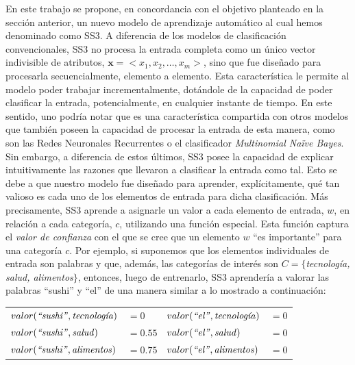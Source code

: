 En este trabajo se propone, en concordancia con el objetivo planteado en la sección anterior, un nuevo modelo de aprendizaje automático al cual hemos denominado como SS3. A diferencia de los modelos de clasificación convencionales, SS3 no procesa la entrada completa como un único vector indivisible de atributos, $\pmb{x}=<x_1,x_2,\dots,x_m>$, sino que fue diseñado para procesarla secuencialmente, elemento a elemento.
Esta característica le permite al modelo poder trabajar incrementalmente, dotándole de la capacidad de poder clasificar la entrada, potencialmente, en cualquier instante de tiempo.
En este sentido, uno podría notar que es una característica compartida con otros modelos que también poseen la capacidad de procesar la entrada de esta manera, como son las Redes Neuronales Recurrentes o el clasificador \emph{Multinomial Naïve Bayes}.
Sin embargo, a diferencia de estos últimos, SS3 posee la capacidad de explicar intuitivamente las razones que llevaron a clasificar la entrada como tal.
Esto se debe a que nuestro modelo fue diseñado para aprender, explícitamente, qué tan valioso es cada uno de los elementos de entrada para dicha clasificación.
Más precisamente, SS3 aprende a asignarle un valor a cada elemento de entrada, $w$, en relación a cada categoría, $c$, utilizando una función especial.
Esta función captura el \emph{valor de confianza} con el que se cree que un elemento $w$ ``es importante'' para una categoría $c$.
Por ejemplo, si suponemos que los elementos individuales de entrada son palabras y que, además, las categorías de interés son $C= \{$\emph{tecnología, salud, alimentos}$\}$, entonces, luego de entrenarlo, SS3 aprendería a valorar las palabras ``sushi'' y ``el'' de una manera similar a lo mostrado a continuación:

\vspace{5mm}
\begin{tabular}{l l@{\hskip 1in}l l}
$valor(\text{\emph{``sushi''}}, \text{\emph{tecnología}}) $ & $= 0$ & $valor(\text{\emph{``el''}}, \text{\emph{tecnología}}) $ & $= 0$\\
$valor(\text{\emph{``sushi''}}, \text{\emph{salud}}) $ & $= 0.55$ & $valor(\text{\emph{``el''}}, \text{\emph{salud}}) $ & $= 0$\\
$valor(\text{\emph{``sushi''}}, \text{\emph{alimentos}}) $ & $= 0.75$  & $valor(\text{\emph{``el''}}, \text{\emph{alimentos}}) $ & $= 0$\\
\end{tabular}
\vspace{5mm}

